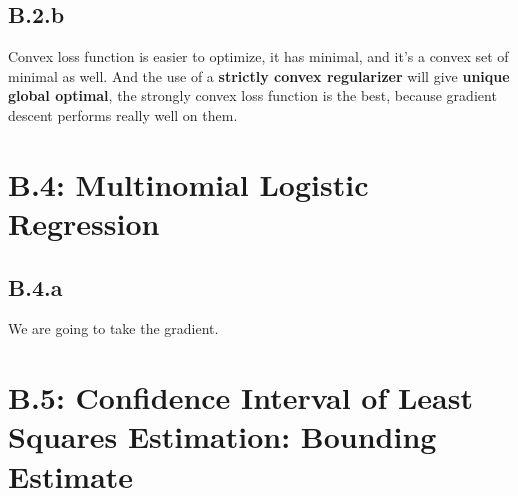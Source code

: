 \documentclass[]{article}
\begin{document}
    \subsection*{B.2.b}
        Convex loss function is easier to optimize, it has minimal, and it's a convex set of minimal as well. And the use of a \textbf{strictly convex regularizer} will give \textbf{unique global optimal}, the strongly convex loss function is the best, because gradient descent performs really well on them. 
\section*{B.4: Multinomial Logistic Regression}
    \subsection*{B.4.a}
        We are going to take the gradient. 
\section*{B.5: Confidence Interval of Least Squares Estimation: Bounding Estimate}
\end{document}
